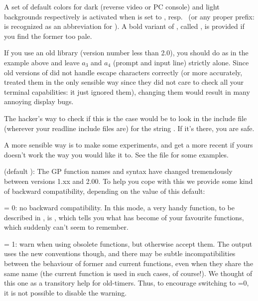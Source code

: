A set of default colors for dark (reverse video or PC console) and light
backgrounds respectively is activated when  is set to
, resp.~ (or any proper prefix:  is
recognized as an abbreviation for ). A bold variant of
, called , is provided if you find the former too
pale.


If you use an old  library (version number less than 2.0),
you should do as in the example above and leave $a_3$ and $a_4$ (prompt
and input line) strictly alone. Since old versions of  did
not handle escape characters correctly (or more accurately, treated them
in the only sensible way since they did not care to check all your terminal
capabilities: it just ignored them), changing them would result in many
annoying display bugs.

The hacker's way to check if this is the case would be to look in the
 include file (wherever your readline include files are) for
the string . If it's there, you are safe.

A more sensible way is to make some experiments, and get a more recent
 if yours doesn't work the way you would like it to. See the
file  for some examples.

 (default ): The GP function names and syntax
have changed tremendously between versions 1.xx and 2.00. To help you cope
with this we provide some kind of backward compatibility, depending on the
value of this default:

\quad {} = 0: no backward compatibility. In this mode, a very
handy function, to be described in , is ,
which tells you what has become of your favourite functions, which 
suddenly can't seem to remember.

\quad {} = 1: warn when using obsolete functions, but
otherwise accept them. The output uses the new conventions though, and
there may be subtle incompatibilities between the behaviour of former and
current functions, even when they share the same name (the current function
is used in such cases, of course!). We thought of this one as a transitory
help for  old-timers. Thus, to encourage switching to =0,
it is not possible to disable the warning.


